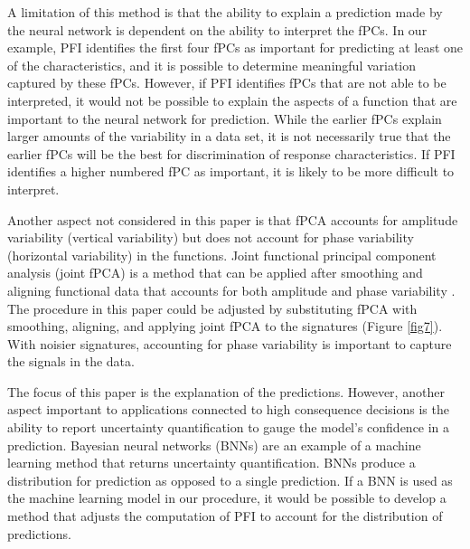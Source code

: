 \documentclass[letterpaper]{article}
\begin{document}
A limitation of this method is that the ability to explain a prediction made by the neural network is dependent on the ability to interpret the fPCs. In our example, PFI identifies the first four fPCs as important for predicting at least one of the characteristics, and it is possible to determine meaningful variation captured by these fPCs. However, if PFI identifies fPCs that are not able to be interpreted, it would not be possible to explain the aspects of a function that are important to the neural network for prediction. While the earlier fPCs explain larger amounts of the variability in a data set, it is not necessarily true that the earlier fPCs will be the best for discrimination of response characteristics. If PFI identifies a higher numbered fPC as important, it is likely to be more difficult to interpret.

Another aspect not considered in this paper is that fPCA accounts for amplitude variability (vertical variability) but does not account for phase variability (horizontal variability) in the functions. Joint functional principal component analysis (joint fPCA) is a method that can be applied after smoothing and aligning functional data that accounts for both amplitude and phase variability \cite{lee:2017,tucker:2013}. The procedure in this paper could be adjusted by substituting fPCA with smoothing, aligning, and applying joint fPCA to the signatures (Figure \ref{fig7}). With noisier signatures, accounting for phase variability is important to capture the signals in the data.

The focus of this paper is the explanation of the predictions. However, another aspect important to applications connected to high consequence decisions is the ability to report uncertainty quantification to gauge the model's confidence in a prediction. Bayesian neural networks (BNNs) are an example of a machine learning method that returns uncertainty quantification. BNNs produce a distribution for prediction as opposed to a single prediction. If a BNN is used as the machine learning model in our procedure, it would be possible to develop a method that adjusts the computation of PFI to account for the distribution of predictions.
\end{document}

